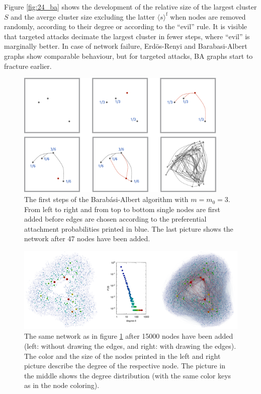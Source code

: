 \documentclass{scrartcl}
\begin{document}
Figure \ref{fig:24_ba} shows the development of the relative size of the largest cluster $S$ and the averge cluster size excluding
 the latter $\langle s\rangle^\mathrm{f}$ when nodes are removed randomly, according to their degree or according to the \enquote{evil}
rule. It is visible that targeted attacks decimate the largest cluster in fewer steps, where \enquote{evil} is marginally better. 
In case of network failure, Erdös-Renyi and Barabasi-Albert graphs show comparable behaviour, but for targeted attacks, BA graphs start to fracture earlier.

\begin{figure}
    \centering
    \includegraphics[width=0.9\textwidth]{pictures/21_begin.pdf}
    \caption{The first steps of the Barab\'asi-Albert algorithm with $m
    = m_0 = 3$. From left to right and from top to bottom single nodes are
    first added before edges are chosen according to the preferential
    attachment probabilities printed in blue. The last picture shows the network
    after 47 nodes have been added.}
    \label{fig:21_begin}
\end{figure}

\begin{figure}
    \includegraphics[width=\textwidth]{pictures/21_end.pdf}
    \caption{The same network as in figure \ref{fig:21_begin} after 15000
    nodes have been added (left: without drawing the edges, and right: with
    drawing the edges). The color and the size of the nodes printed in the left
    and right picture describe the degree of the respective node. The
    picture in the middle shows the degree distribution (with the same color
    keys as in the node coloring).}
    \label{fig:21_end}
\end{figure}
\end{document}
